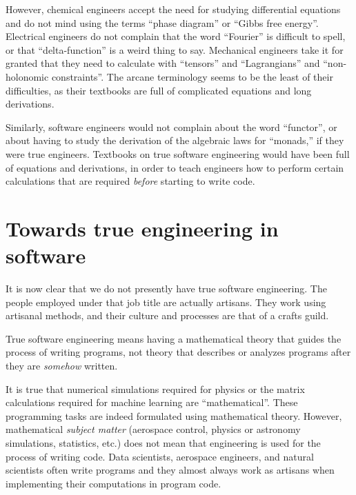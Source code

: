 However, chemical engineers accept the need for studying differential
equations and do not mind using the terms \textsf{``}phase diagram\textsf{''} or \textsf{``}Gibbs
free energy\textsf{''}. Electrical engineers do not complain that the word
\textsf{``}Fourier\textsf{''} is difficult to spell, or that \textsf{``}delta-function\textsf{''}
is a weird thing to say. Mechanical engineers take it for granted
that they need to calculate with \textsf{``}tensors\textsf{''} and \textsf{``}Lagrangians\textsf{''}
and \textsf{``}non-holonomic constraints\textsf{''}. The arcane terminology seems
to be the least of their difficulties, as their textbooks are full
of complicated equations and long derivations.

Similarly, software engineers would not complain about the word \textsf{``}functor\textsf{''},
or about having to study the derivation of the algebraic laws for
\textsf{``}monads,\textsf{''} \textemdash{} if they were true engineers. Textbooks
on true software engineering would have been full of equations and
derivations, in order to teach engineers how to perform certain calculations
that are required \emph{before} starting to write code.

\section{Towards true engineering in software}

It is now clear that we do not presently have true software engineering.
The people employed under that job title are actually artisans. They
work using artisanal methods, and their culture and processes are
that of a crafts guild.

True software engineering means having a mathematical theory that
guides the process of writing programs, \textemdash{} not theory that
describes or analyzes programs after they are \emph{somehow} written.

It is true that numerical simulations required for physics or the
matrix calculations required for machine learning are \textsf{``}mathematical\textsf{''}.
These programming tasks are indeed formulated using mathematical theory.
However, mathematical \emph{subject matter} (aerospace control, physics
or astronomy simulations, statistics, etc.) does not mean that engineering
is used for the process of writing code. Data scientists, aerospace
engineers, and natural scientists often write programs \textemdash{}
and they almost always work as artisans when implementing their computations
in program code.

